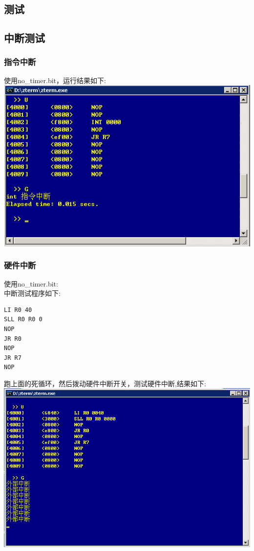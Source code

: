 \documentclass[10pt]{article}
\begin{document}
\begin{CJK}{UTF8}{gbsn}
\section{测试}
\subsection{中断测试}
\subsubsection{指令中断}
使用no\_timer.bit，运行结果如下:\\
\includegraphics[width=\linewidth]{instruction_int.png}

\subsubsection{硬件中断}
使用no\_timer.bit:\\
中断测试程序如下:\\
\begin{verbatim}
LI R0 40
SLL R0 R0 0
NOP
JR R0
NOP
JR R7
NOP
\end{verbatim}
跑上面的死循环，然后拨动硬件中断开关，测试硬件中断,结果如下:\\
\includegraphics[width=\linewidth]{ex_int.png}


\end{CJK}
\end{document}
